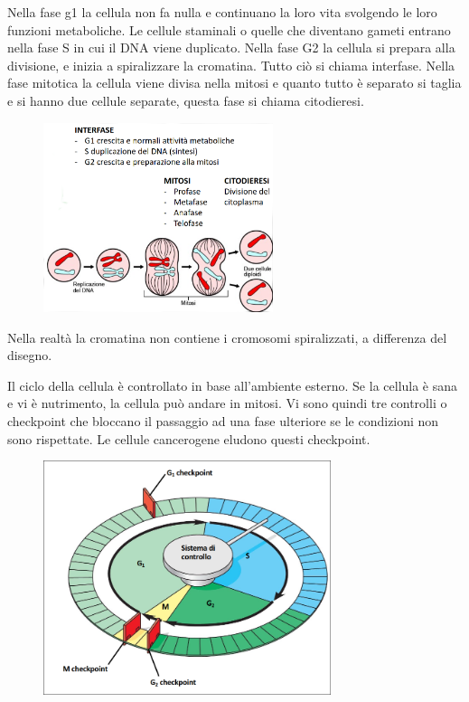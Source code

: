 \documentclass[a4paper]{article}
\begin{document}
Nella fase g1 la cellula non fa nulla e continuano la loro vita svolgendo le loro funzioni metaboliche. 
Le cellule staminali o quelle che diventano gameti entrano nella fase S in cui il DNA viene duplicato. 
Nella fase G2 la cellula si prepara alla divisione, e inizia a spiralizzare la cromatina. 
Tutto ciò si chiama interfase.
Nella fase mitotica la cellula viene divisa nella mitosi e quanto tutto è separato si taglia e si hanno due cellule separate, questa fase si chiama citodieresi.

\begin{center}
\begin{figure}[ht!]
    \centering
    \includegraphics[width=0.6\textwidth]{./ciclo_cellulare2}
\end{figure}
\end{center}

Nella realtà la cromatina non contiene i cromosomi spiralizzati, a differenza del disegno.

Il ciclo della cellula è controllato in base all'ambiente esterno.
Se la cellula è sana e vi è nutrimento, la cellula può andare in mitosi.
Vi sono quindi tre controlli o checkpoint che bloccano il passaggio ad una fase ulteriore
se le condizioni non sono rispettate.
Le cellule cancerogene eludono questi checkpoint.

\begin{center}
\begin{figure}[ht]
    \centering
    \includegraphics[width=0.75\textwidth]{./ciclo_cellulare3}
\end{figure}
\end{center}
\end{document}
